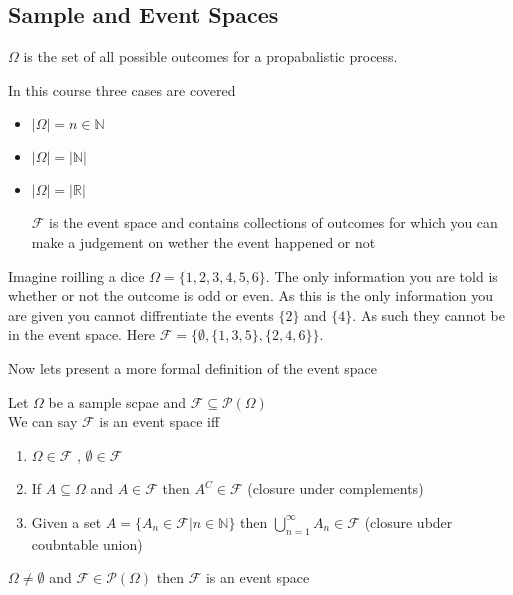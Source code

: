 \documentclass{article}
\begin{document}
\subsection{Sample and Event Spaces}
\begin{definition}
    $\Omega$ is the set of all possible outcomes for a propabalistic process.
\end{definition}
In this course three cases are covered
\begin{itemize}
    \item $|\Omega| = n \in \mathbb{N}$
    \item $|\Omega| = |\mathbb{N}|$
    \item $|\Omega| = |\mathbb{R}|$
    \begin{definition}
        $\mathcal{F}$ is the event space and contains collections of outcomes for which you can make a judgement on wether the event happened or not
    \end{definition}
\end{itemize}
\begin{example}
    Imagine roilling a dice $\Omega = \{1,2,3,4,5,6\}$. The only information you are told is whether or not the outcome is odd or even. As this is the only information you are given you cannot diffrentiate the events $\{2\}$ and $\{4\}$. As such they cannot be in the event space. Here $\mathcal{F} = \{\emptyset,\{1,3,5\},\{2,4,6\}\}$.
\end{example}
Now lets present a more formal definition of the event space
\begin{definition}
    Let $\Omega$ be a sample scpae and $\mathcal{F} \subseteq \mathcal{P}(\Omega)$ \\
    We can say $\mathcal{F}$ is an event space iff
    \begin{enumerate}
        \item $\Omega \in \mathcal{F}$ , $\emptyset \in \mathcal{F}$
        \item If $A \subseteq \Omega$ and $A \in \mathcal{F}$ then $A^C \in \mathcal{F}$ (closure under complements)
        \item Given a set $A = \{A_n \in \mathcal{F}| n \in \mathbb{N}\}$ then $\bigcup_{n=1}^{\infty}A_n \in \mathcal{F}$ (closure ubder coubntable union)
    \end{enumerate}
\end{definition}
\begin{proposition}
    $\Omega \ne \emptyset$ and $\mathcal{F} \in \mathcal{P}(\Omega)$ then $\mathcal{F}$ is an event space
\end{proposition}
\end{document}
